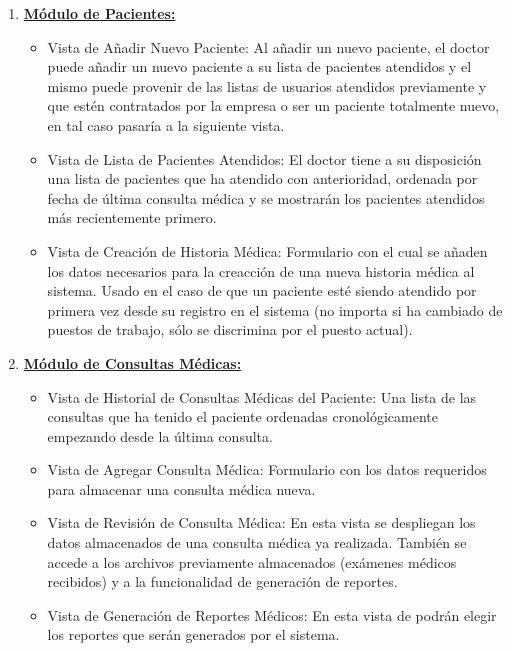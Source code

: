 \begin{enumerate}
        \item \textbf{\underline{Módulo de Pacientes:}}
        \begin{itemize}
            \item Vista de Añadir Nuevo Paciente: Al añadir un nuevo paciente, el doctor puede añadir un nuevo paciente a su lista de pacientes atendidos y el mismo puede provenir de las listas de usuarios atendidos previamente y que estén contratados por la empresa o ser un paciente totalmente nuevo, en tal caso pasaría a la siguiente vista.
            \item Vista de Lista de Pacientes Atendidos: El doctor tiene a su disposición una lista de pacientes que ha atendido con anterioridad, ordenada por fecha de última consulta médica y se mostrarán los pacientes atendidos más recientemente primero.
            \item Vista de Creación de Historia Médica: Formulario con el cual se añaden los datos necesarios para la creacción de una nueva historia médica al sistema. Usado en el caso de que un paciente esté siendo atendido por primera vez desde su registro en el sistema (no importa si ha cambiado de puestos de trabajo, sólo se discrimina por el puesto actual).
        \end{itemize}
        
        \item \textbf{\underline{Módulo de Consultas Médicas:}}
        \begin{itemize}
            \item Vista de Historial de Consultas Médicas del Paciente: Una lista de las consultas que ha tenido el paciente ordenadas cronológicamente empezando desde la última consulta.
            \item Vista de Agregar Consulta Médica: Formulario con los datos requeridos para almacenar una consulta médica nueva.
            \item Vista de Revisión de Consulta Médica: En esta vista se despliegan los datos almacenados de una consulta médica ya realizada. También se accede a los archivos previamente almacenados (exámenes médicos recibidos) y a la funcionalidad de generación de reportes.
            \item Vista de Generación de Reportes Médicos: En esta vista de podrán elegir los reportes que serán generados por el sistema.            
        \end{itemize}
    \end{enumerate}
    
